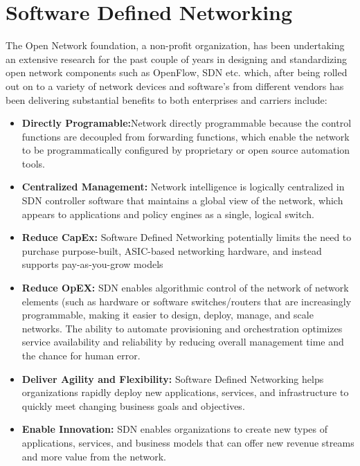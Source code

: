 
\chapter{Software Defined Networking}\label{ch:software_defined_networking}
\sffamily{}
The Open Network foundation, a non-profit organization, has been undertaking an extensive research for the past couple of years in designing and standardizing open network components such as OpenFlow, SDN etc. which, after being rolled out on to a variety of network devices and software’s from different vendors has been delivering substantial benefits to both enterprises and carriers include: \cite{What_is_SDN}

\begin{itemize}
	\item \textbf{Directly Programable:}Network directly programmable because the control functions are decoupled from forwarding functions, which enable the network to be programmatically configured by proprietary or open source automation tools.
	\item \textbf{Centralized Management:} Network intelligence is logically centralized in SDN controller software that maintains a global view of the network, which appears to applications and policy engines as a single, logical switch.
	\item \textbf{Reduce CapEx:} Software Defined Networking potentially limits the need to purchase purpose-built, ASIC-based networking hardware, and instead supports pay-as-you-grow models
	\item \textbf{Reduce OpEX:} SDN enables algorithmic control of the network of network elements (such as hardware or software switches/routers that are increasingly programmable, making it easier to design, deploy, manage, and scale networks. The ability to automate provisioning and orchestration optimizes service availability and reliability by reducing overall management time and the chance for human error.
	\item \textbf{Deliver Agility and Flexibility:} Software Defined Networking helps organizations rapidly deploy new applications, services, and infrastructure to quickly meet changing business goals and objectives.
	\item \textbf{Enable Innovation:} SDN enables organizations to create new types of applications, services, and business models that can offer new revenue streams and more value from the network.
	
\end{itemize}
